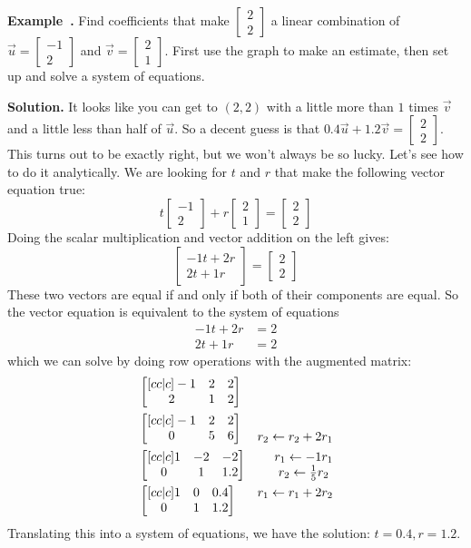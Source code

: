 \documentclass[11pt, letterpaper]{report}
\newenvironment{notes}{}{}
\newenvironment{book}{}{}
\newcounter{example}[section]
\newcommand{\example}{\refstepcounter{example}%
\par\noindent\textbf{Example~\theexample.} }
\newcommand{\bbvec}[2]{
  \begin{bmatrix} #1 \\ #2 \end{bmatrix}
}
\begin{document}
\begin{book}
\end{book}

\example {} Find coefficients that make $\bbvec{2}{2}$ a linear combination of $\vec{u} = \bbvec{-1}{2}$ and $\vec{v}=\bbvec{2}{1}$. First use the graph to make an estimate, then set up and solve a system of equations.

\begin{notes}
\vfill
\end{notes}

\begin{book}
\textbf{Solution.} It looks like you can get to $(2,2)$ with a little more than $1$ times $\vec{v}$ and a little less than half of $\vec{u}$. So a decent guess is that $0.4\vec{u} + 1.2\vec{v} = \bbvec{2}{2}$. This turns out to be exactly right, but we won't always be so lucky. Let's see how to do it analytically. We are looking for $t$ and $r$ that make the following vector equation true:
\[t \bbvec{-1}{2} + r \bbvec{2}{1} = \bbvec{2}{2}\]
Doing the scalar multiplication and vector addition on the left gives:
\[\bbvec{-1t +2r}{2t+1r} = \bbvec{2}{2}\]
These two vectors are equal if and only if both of their components are equal. So the vector equation is equivalent to the system of equations
\[\begin{aligned}
-1t+2r &= 2 \\
2t +1r &= 2
\end{aligned}\]
which we can solve by doing row operations with the augmented matrix:
\begin{align*}
&\begin{bmatrix}[cc|c]
-1 & 2 & 2 \\
2 & 1 & 2
\end{bmatrix} \\
&\begin{bmatrix}[cc|c]
-1 & 2 & 2 \\
0 & 5 & 6
\end{bmatrix} &\begin{matrix}
\rule{0em}{1em} \\ r_2 \leftarrow r_2+2r_1 \end{matrix} \\
&\begin{bmatrix}[cc|c]
1 & -2 & -2 \\
0 & 1 & 1.2
\end{bmatrix} &\begin{matrix}r_1\leftarrow -1r_1 \\ r_2 \leftarrow \frac{1}{5}r_2 \end{matrix} \\
&\begin{bmatrix}[cc|c]
1 & 0 & 0.4 \\
0 & 1 & 1.2
\end{bmatrix} &\begin{matrix} r_1\leftarrow r_1+2r_2 \\ \rule{1em}{0pt} \end{matrix} 
\end{align*}
Translating this into a system of equations, we have the solution: $t=0.4, r=1.2$. \blacksquare
\end{book}
\end{document}
